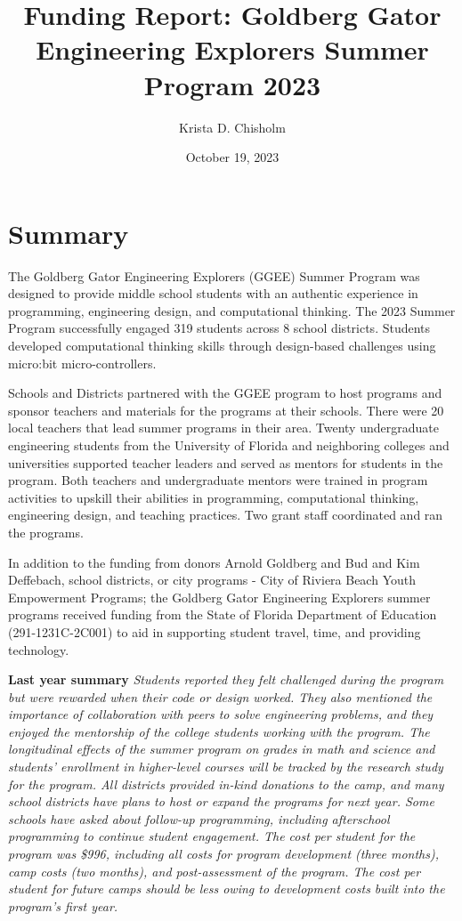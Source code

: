 \documentclass[
]{article}
\title{Funding Report: Goldberg Gator Engineering Explorers Summer
Program 2023}
\author{Krista D. Chisholm}
\date{October 19, 2023}
\begin{document}
\maketitle

{
\setcounter{tocdepth}{2}
\tableofcontents
}
\hypertarget{summary}{%
\section{Summary}\label{summary}}

The Goldberg Gator Engineering Explorers (GGEE) Summer Program was
designed to provide middle school students with an authentic experience
in programming, engineering design, and computational thinking. The 2023
Summer Program successfully engaged 319 students across 8 school
districts. Students developed computational thinking skills through
design-based challenges using micro:bit micro-controllers.

Schools and Districts partnered with the GGEE program to host programs
and sponsor teachers and materials for the programs at their schools.
There were 20 local teachers that lead summer programs in their area.
Twenty undergraduate engineering students from the University of Florida
and neighboring colleges and universities supported teacher leaders and
served as mentors for students in the program. Both teachers and
undergraduate mentors were trained in program activities to upskill
their abilities in programming, computational thinking, engineering
design, and teaching practices. Two grant staff coordinated and ran the
programs.

In addition to the funding from donors Arnold Goldberg and Bud and Kim
Deffebach, school districts, or city programs - City of Riviera Beach
Youth Empowerment Programs; the Goldberg Gator Engineering Explorers
summer programs received funding from the State of Florida Department of
Education (291-1231C-2C001) to aid in supporting student travel, time,
and providing technology.

\textbf{Last year summary} \emph{Students reported they felt challenged
during the program but were rewarded when their code or design worked.
They also mentioned the importance of collaboration with peers to solve
engineering problems, and they enjoyed the mentorship of the college
students working with the program. The longitudinal effects of the
summer program on grades in math and science and students' enrollment in
higher-level courses will be tracked by the research study for the
program. All districts provided in-kind donations to the camp, and many
school districts have plans to host or expand the programs for next
year. Some schools have asked about follow-up programming, including
afterschool programming to continue student engagement. The cost per
student for the program was \$996, including all costs for program
development (three months), camp costs (two months), and post-assessment
of the program. The cost per student for future camps should be less
owing to development costs built into the program's first year.}
\end{document}
